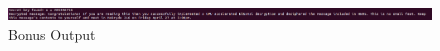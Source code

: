 \documentclass{article}
\newcommand{\myhrule}{ \begin{center}\rule{.9\linewidth}{.25mm}\end{center} }
\begin{document}
\begin{figure}[h] 
    \centering
    \caption{Bonus Output}
    \includegraphics[scale = 0.75]{bonus.PNG}
\end{figure}

 
\end{document}
